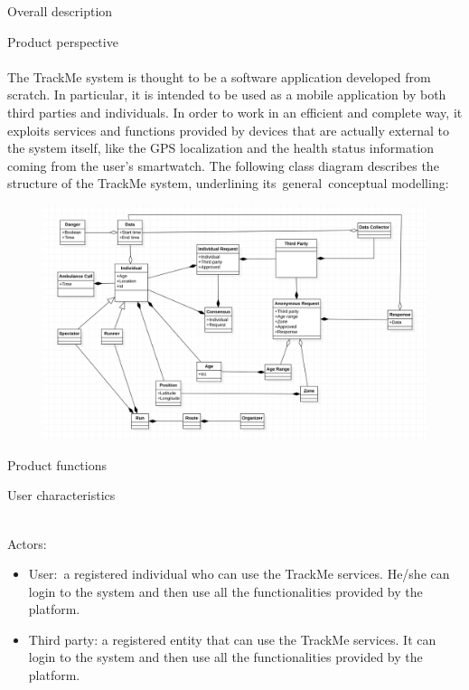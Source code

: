 \documentclass{article}
\begin{document}
\begin{legal}
\newpage
  	\item {Overall description}
  		\begin{legal}
    		\item Product perspective\\\\
			{\normalfont
			The TrackMe system is thought to be a software application developed from scratch. In particular, it is intended to be used as a mobile application by both third parties 				and individuals.
			In order to work in an efficient and complete way, it exploits services and functions provided by devices that are actually external to the system itself, like the GPS 					localization and the health status information coming from the user’s smartwatch.
			The following class diagram describes the structure of the TrackMe system, underlining its general conceptual modelling:
			}
			\begin{figure}[H]
  			\includegraphics[width=\linewidth]{./images/UML1-0.png}
			\end{figure}
		\item Product functions \\
		\item User characteristics \\\\
			{\normalfont
			Actors:\\
			\begin{itemize}
			 \item{User: a registered individual who can use the TrackMe services. He/she can login to the system and then use all the functionalities provided by the platform.}

			 \item{Third party: a registered entity that can use the TrackMe services. It can login to the system and then use all the functionalities provided by the platform.}


\end{itemize}}
\end{legal}
\end{legal}
\end{document}
